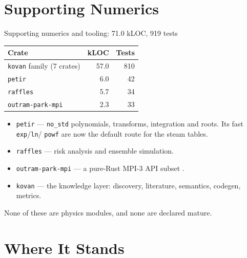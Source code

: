 \documentclass[aspectratio=169]{beamer}
\newcommand{\statustab}[1]{{\footnotesize\setlength{\tabcolsep}{4pt}#1}}
\begin{document}
\section{Supporting Numerics}

\begin{frame}{Supporting numerics and tooling: 71.0 kLOC, 919 tests}
    \statustab{
    \begin{tabular}{lrr}
        \toprule
        \textbf{Crate} & \textbf{kLOC} & \textbf{Tests} \\
        \midrule
        \texttt{kovan} family (7 crates) & 57.0 & 810 \\
        \texttt{petir}                   &  6.0 &  42 \\
        \texttt{raffles}                 &  5.7 &  34 \\
        \texttt{outram-park-mpi}         &  2.3 &  33 \\
        \bottomrule
    \end{tabular}}

    \medskip
    \begin{itemize}
        \item \texttt{petir} --- \texttt{no\_std} polynomials, transforms,
              integration and roots. Its fast \texttt{exp}/\texttt{ln}/
              \texttt{powf} are now the default route for the steam tables.
        \item \texttt{raffles} --- risk analysis and ensemble simulation.
        \item \texttt{outram-park-mpi} --- a pure-Rust MPI-3 API subset
              \parencite{mpiforum2015}.
        \item \texttt{kovan} --- the knowledge layer: discovery, literature,
              semantics, codegen, metrics.
    \end{itemize}

    None of these are physics modules, and none are declared mature.
\end{frame}


\section{Where It Stands}
\end{document}
